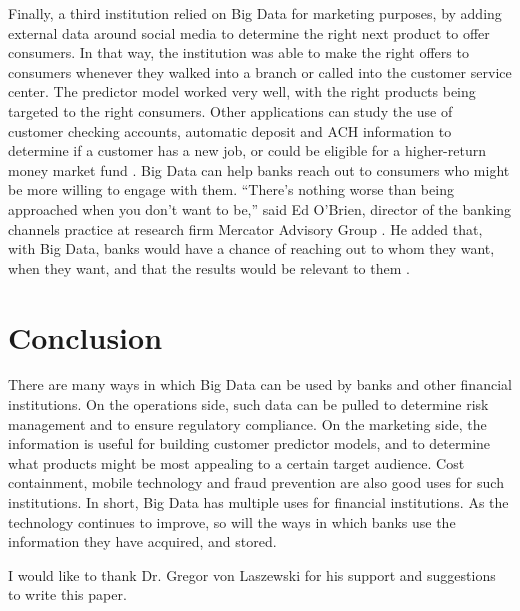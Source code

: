\documentclass[sigconf]{acmart}
\begin{document}
Finally, a third institution relied on Big Data for marketing purposes, by adding external data around social media to determine the right next product to offer consumers. In that way, the institution was able to make the right offers to consumers whenever they walked into a branch or called into the customer service center. The predictor model worked very well, with the right products being targeted to the right consumers.
Other applications can study the use of customer checking accounts, automatic deposit and ACH information to determine if a customer has a new job, or could be eligible for a higher-return money market fund \cite{he2017fintech}. Big Data can help banks reach out to consumers who might be more willing to engage with them. “There’s nothing worse than being approached when you don’t want to be,” said Ed O’Brien, director of the banking channels practice at research firm Mercator Advisory Group \cite{he2017fintech}. He added that, with Big Data, banks would have a chance of reaching out to whom they want, when they want, and that the results would be relevant to them \cite{he2017fintech}.



\section{Conclusion}

There are many ways in which Big Data can be used by banks and other financial institutions. On the operations side, such data can be pulled to determine risk management and to ensure regulatory compliance. On the marketing side, the information is useful for building customer predictor models, and to determine what products might be most appealing to a certain target audience. Cost containment, mobile technology and fraud prevention are also good uses for such institutions.
In short, Big Data has multiple uses for financial institutions. As the technology continues to improve, so will the ways in which banks use the information they have acquired, and stored.



\begin{acks}

  I would like to thank Dr. Gregor von Laszewski for his
  support and suggestions to write this paper.

\end{acks}



\end{document}
